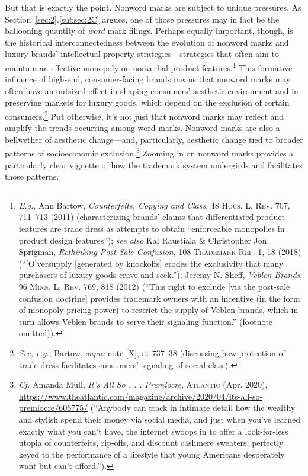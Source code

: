 \documentclass[letterpaper, 11pt, oneside]{article}
\begin{document}
But that is exactly the point. Nonword marks are subject to unique pressures. As Section~\ref{sec:2}.\ref{subsec:2C} argues, one of those pressures may in fact be the ballooning quantity of \textit{word} mark filings. Perhaps equally important, though, is the historical interconnectedness between the evolution of nonword marks and luxury brands' intellectual property strategies—strategies that often aim to maintain an effective monopoly on nonverbal product features.\footnote{\textit{E.g.}, Ann Bartow, \textit{Counterfeits, Copying and Class}, 48 \textsc{Hous. L. Rev.} 707, 711–713 (2011) (characterizing brands' claims that differentiated product features are trade dress as attempts to obtain ``enforceable monopolies in product design features''); \textit{see also} Kal Raustiala \& Christopher Jon Sprigman, \textit{Rethinking Post-Sale Confusion}, 108 \textsc{Trademark Rep.} 1, 18 (2018) (``[O]versupply [generated by knockoffs] erodes the exclusivity that many purchasers of luxury goods crave and seek.''); Jeremy N. Sheff, \textit{Veblen Brands}, 96 \textsc{Minn. L. Rev.} 769, 818 (2012) (``This right to exclude [via the post-sale confusion doctrine] provides trademark owners with an incentive (in the form of monopoly pricing power) to restrict the supply of Veblen brands, which in turn allows Veblen brands to serve their signaling function.'' (footnote omitted)).} This formative influence of high-end, consumer-facing brands means that nonword marks may often have an outsized effect in shaping consumers' aesthetic environment and in preserving markets for luxury goods, which depend on the exclusion of certain consumers.\footnote{\textit{See, e.g.}, Bartow, \textit{supra} note [X], at 737–38 (discussing how protection of trade dress facilitates consumers' signaling of social class).} Put otherwise, it's not just that nonword marks may reflect and amplify the trends occurring among word marks. Nonword marks are also a bellwether of aesthetic change—and, particularly, aesthetic change tied to broader patterns of socioeconomic exclusion.\footnote{\textit{Cf.} Amanda Mull, \textit{It's All So . . . Premiocre}, \textsc{Atlantic} (Apr. 2020), \url{https://www.theatlantic.com/magazine/archive/2020/04/its-all-so-premiocre/606775/} (``Anybody can track in intimate detail how the wealthy and stylish spend their money via social media, and just when you’ve learned exactly what you can’t have, the internet swoops in to offer a look-for-less utopia of counterfeits, rip-offs, and discount cashmere sweaters, perfectly keyed to the performance of a lifestyle that young Americans desperately want but can’t afford.'').} Zooming in on nonword marks provides a particularly clear vignette of how the trademark system undergirds and facilitates those patterns.
\end{document}
